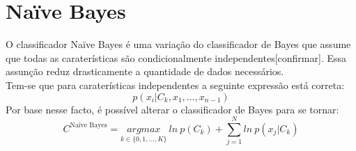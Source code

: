 \documentclass[]{report}
\begin{document}
\section{Naïve Bayes}
O classificador Naïve Bayes é uma variação do classificador de Bayes que assume que todas as caraterísticas são condicionalmente independentes[confirmar]. Essa assunção reduz drasticamente a quantidade de dados necessários.\\[0.2cm]
Tem-se que para caraterísticas independentes a seguinte expressão está correta:
$$ p(x_i | C_k, x_1, \dots , x_{n-1}) $$
Por base nesse facto, é possível alterar o classificador de Bayes para se tornar:
$$C^{\text{Naïve Bayes}} = \underset{k\in \{0,1,\dots,K\}}{argmax} \> ln\> p(C_k) + \sum^N_{j=1} ln \> p(x_j | C_k)$$
\end{document}
